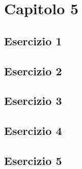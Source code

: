\section{\textbf{Capitolo 5}}
\subsection{Esercizio 1}

\newpage
\subsection{Esercizio 2}

\newpage
\subsection{Esercizio 3}

\newpage
\subsection{Esercizio 4}

\newpage
\subsection{Esercizio 5}

\newpage